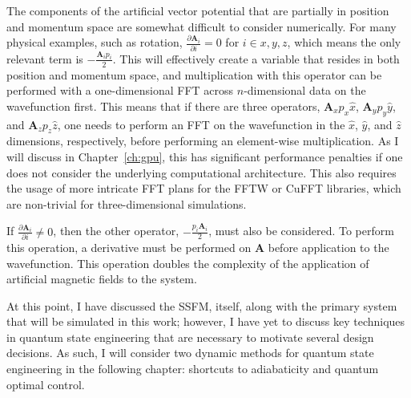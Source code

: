 The components of the artificial vector potential that are partially in position and momentum space are somewhat difficult to consider numerically.
For many physical examples, such as rotation, $\frac{\partial \mathbf{A}_i}{\partial i} = 0$ for $i \in {x, y, z}$, which means the only relevant term is $-\frac{\mathbf{A}_i p_i}{2}$.
This will effectively create a variable that resides in both position and momentum space, and multiplication with this operator can be performed with a one-dimensional FFT across $n$-dimensional data on the wavefunction first.
This means that if there are three operators, $\mathbf{A}_x p_x\hat x$, $\mathbf{A}_y p_y\hat y$, and $\mathbf{A}_z p_z\hat z$, one needs to perform an FFT on the wavefunction in the $\hat x$, $\hat y$, and $\hat z$ dimensions, respectively, before performing an element-wise multiplication. 
As I will discuss in Chapter~\ref{ch:gpu}, this has significant performance penalties if one does not consider the underlying computational architecture.
This also requires the usage of more intricate FFT plans for the FFTW or CuFFT libraries, which are non-trivial for three-dimensional simulations.

If $\frac{\partial \mathbf{A}_i}{\partial i} \neq 0$, then the other operator, $-\frac{p_i\mathbf{A}_i}{2}$, must also be considered.
To perform this operation, a derivative must be performed on $\mathbf{A}$ before application to the wavefunction. 
This operation doubles the complexity of the application of artificial magnetic fields to the system.

At this point, I have discussed the SSFM, itself, along with the primary system that will be simulated in this work; however, I have yet to discuss key techniques in quantum state engineering that are necessary to motivate several design decisions.
As such, I will consider two dynamic methods for quantum state engineering in the following chapter: shortcuts to adiabaticity and quantum optimal control.

